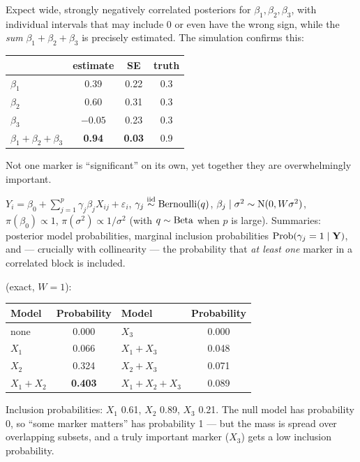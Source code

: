\documentclass[11pt]{article}
\begin{document}
\solution
{} Expect wide, strongly negatively correlated posteriors for $\beta_1,\beta_2,\beta_3$, with individual intervals that may include 0 or even have the wrong sign, while the \emph{sum} $\beta_1+\beta_2+\beta_3$ is precisely estimated. The simulation confirms this:
\begin{center}
\begin{tabular}{lccc}\toprule
 & estimate & SE & truth\\\midrule
$\beta_1$ & 0.39 & 0.22 & 0.3\\
$\beta_2$ & 0.60 & 0.31 & 0.3\\
$\beta_3$ & $-0.05$ & 0.23 & 0.3\\
$\beta_1+\beta_2+\beta_3$ & \textbf{0.94} & \textbf{0.03} & 0.9\\\bottomrule
\end{tabular}
\end{center}
Not one marker is ``significant'' on its own, yet together they are overwhelmingly important.

$Y_i=\beta_0+\sum_{j=1}^p\gamma_j\beta_jX_{ij}+\varepsilon_i$, $\gamma_j\stackrel{\text{iid}}{\sim}\mathrm{Bernoulli}(q)$, $\beta_j\mid\sigma^2\sim\mathrm{N}(0,W\sigma^2)$, $\pi(\beta_0)\propto1$, $\pi(\sigma^2)\propto1/\sigma^2$ (with $q\sim\mathrm{Beta}$ when $p$ is large). Summaries: posterior model probabilities, marginal inclusion probabilities $\mathrm{Prob}(\gamma_j=1\mid\mathbf Y)$, and --- crucially with collinearity --- the probability that \emph{at least one} marker in a correlated block is included.

 (exact, $W=1$):
\begin{center}
\begin{tabular}{lc|lc}\toprule
Model & Probability & Model & Probability\\\midrule
none & 0.000 & $X_3$ & 0.000\\
$X_1$ & 0.066 & $X_1+X_3$ & 0.048\\
$X_2$ & 0.324 & $X_2+X_3$ & 0.071\\
$X_1+X_2$ & \textbf{0.403} & $X_1+X_2+X_3$ & 0.089\\\bottomrule
\end{tabular}
\end{center}
Inclusion probabilities: $X_1$ 0.61, $X_2$ 0.89, $X_3$ 0.21. The null model has probability 0, so ``some marker matters'' has probability 1 --- but the mass is spread over overlapping subsets, and a truly important marker ($X_3$) gets a low inclusion probability.
\end{document}
